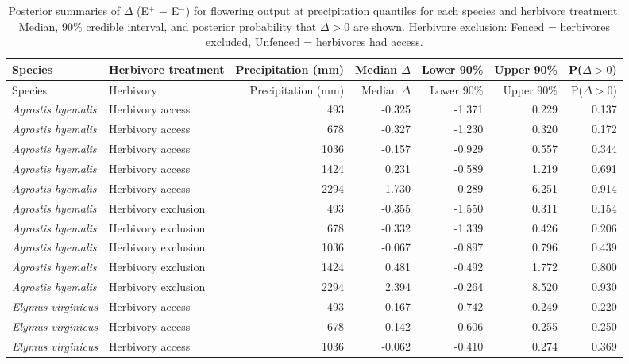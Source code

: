 \documentclass[12pt]{article}\usepackage[]{graphicx}\usepackage[dvipsnames]{xcolor}
\begin{document}
{\begin{landscape}
\begin{table}[ht]
\centering
\caption[Summaries of $\Delta$ (E$^{+}$ $-$ E$^{-}$) for inflorescences across precipitation quantiles]{Posterior summaries of $\Delta$ (E$^{+}$ $-$ E$^{-}$) for flowering output at precipitation quantiles for each species and herbivore  treatment. 
Median, 90\% credible interval, and posterior probability that $\Delta > 0$ are shown. 
Herbivore exclusion: Fenced = herbivores excluded, Unfenced = herbivores had access.}
\label{tab:delta_summary_flow}
\begin{tabular}{llrrrrr}
\hline
Species & Herbivore treatment & Precipitation (mm) & Median $\Delta$  & Lower 90\% & Upper 90\% & P($\Delta>0$) \\
\hline
Species & Herbivory & Precipitation (mm) & Median $\Delta$  & Lower 90\% & Upper 90\% & P($\Delta>0$) \\
\hline
\textit{Agrostis hyemalis} & Herbivory access    & 493  & -0.325 & -1.371 & 0.229  & 0.137 \\
\textit{Agrostis hyemalis} & Herbivory access    & 678  & -0.327 & -1.230 & 0.320  & 0.172 \\
\textit{Agrostis hyemalis} & Herbivory access    & 1036 & -0.157 & -0.929 & 0.557  & 0.344 \\
\textit{Agrostis hyemalis} & Herbivory access    & 1424 & 0.231  & -0.589 & 1.219  & 0.691 \\
\textit{Agrostis hyemalis} & Herbivory access    & 2294 & 1.730  & -0.289 & 6.251  & 0.914 \\
\textit{Agrostis hyemalis} & Herbivory exclusion & 493  & -0.355 & -1.550 & 0.311  & 0.154 \\
\textit{Agrostis hyemalis} & Herbivory exclusion & 678  & -0.332 & -1.339 & 0.426  & 0.206 \\
\textit{Agrostis hyemalis} & Herbivory exclusion & 1036 & -0.067 & -0.897 & 0.796  & 0.439 \\
\textit{Agrostis hyemalis} & Herbivory exclusion & 1424 & 0.481  & -0.492 & 1.772  & 0.800 \\
\textit{Agrostis hyemalis} & Herbivory exclusion & 2294 & 2.394  & -0.264 & 8.520  & 0.930 \\
\textit{Elymus virginicus} & Herbivory access    & 493  & -0.167 & -0.742 & 0.249  & 0.220 \\
\textit{Elymus virginicus} & Herbivory access    & 678  & -0.142 & -0.606 & 0.255  & 0.250 \\
\textit{Elymus virginicus} & Herbivory access    & 1036 & -0.062 & -0.410 & 0.274  & 0.369 \\

\end{tabular}
\end{table}
\end{landscape}}
\end{document}

